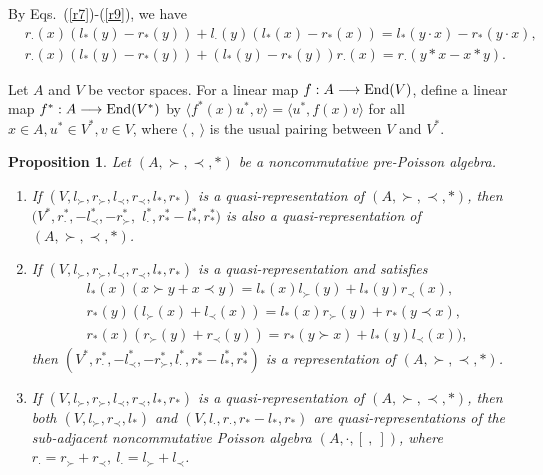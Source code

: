 \documentclass[12pt]{amsart}
\newtheorem{pro}[thm]{Proposition}
\theoremstyle{definition}
\begin{document}
By Eqs.~(\ref{r7})-(\ref{r9}), we have
\begin{align}&\label{r70}r_{\cdot}(x)(l_{\ast}(y)-r_{\ast}(y))
+l_{\cdot}(y)(l_{\ast}(x)-r_{\ast}(x))=l_{\ast}(y\cdot x)-r_{\ast}(y\cdot x),
\\&\label{r80}r_{\cdot}(x)(l_{\ast}(y)-r_{\ast}(y))+(l_{\ast}(y)-r_{\ast}(y))r_{\cdot}(x)=r_{\cdot}(y\ast x-x\ast y).\end{align}

Let $A$ and $V$ be vector spaces. For
a linear map $f: A \longrightarrow \hbox{End} (V)$, define a linear
map $f^{*}: A \longrightarrow \hbox{End} (V^{*})$ by $\langle
f^{*}(x)u^{*},v\rangle=\langle u^{*},f(x)v\rangle$ for all $x\in A,
u^{*}\in V^{*}, v\in V$, where $\langle \ , \ \rangle$ is the usual
pairing between $V$ and $V^{*}$.

\begin{pro} \label{Dr} 
   Let $(A,\succ,\prec,\ast)$ be a noncommutative pre-Poisson algebra.
   \begin{enumerate}
 \item If $(V,l_{\succ},r_{\succ},l_{\prec},r_{\prec},l_{\ast},r_{\ast})$ is a quasi-representation of $(A,\succ,\prec,\ast)$, 
 then $(V^*,r_{\cdot}^{*},-l_{\prec}^{*},-r_{\succ}^{*},$ $l_{\cdot}^{*},r_{\ast}^{*}-l_{\ast}^{*},r_{\ast}^{*})$ is also a quasi-representation of $(A,\succ,\prec,\ast)$.

 \item If $(V,l_{\succ},r_{\succ},l_{\prec},r_{\prec},l_{\ast},r_{\ast})$ is a quasi-representation and satisfies
    \begin{align}&\label{r10}l_{\ast}(x)(x\succ y+x\prec y)=l_{\ast}(x)l_{\succ}(y)+l_{\ast}(y)r_{\prec}(x),\\&
		\label{r11}r_{\ast}(y)(l_{\succ}(x)+l_{\prec}(x))=l_{\ast}(x)r_{\succ}(y)+
r_{\ast} (y\prec x),\\&
		\label{r12}r_{\ast}(x)(r_{\succ}(y)+r_{\prec}(y))=r_{\ast} (y\succ x)+l_{\ast}(y)l_{\prec}(x)),\end{align}
   then $(V^*,r_{\cdot}^{*},-l_{\prec}^{*},-r_{\succ}^{*},l_{\cdot}^{*},r_{\ast}^{*}-l_{\ast}^{*},r_{\ast}^{*})$ is a representation of $(A,\succ,\prec,\ast)$.
    \item If $(V,l_{\succ},r_{\succ},l_{\prec},r_{\prec},l_{\ast},r_{\ast})$ is a quasi-representation of $(A,\succ,\prec,\ast)$,
    then both $(V,l_{\succ},r_{\prec},l_{\ast})$ 
   and $(V,l_{\cdot},r_{\cdot},r_{\ast}-l_{\ast},r_{\ast})$
     are quasi-representations of the sub-adjacent 
    noncommutative Poisson algebra $(A,\cdot,[ \ , \ ])$,
    where $r_{\cdot}=r_{\succ}+r_{\prec},~l_{\cdot}=l_{\succ}+l_{\prec}$.
   \end{enumerate}
\end{pro}
\end{document}
